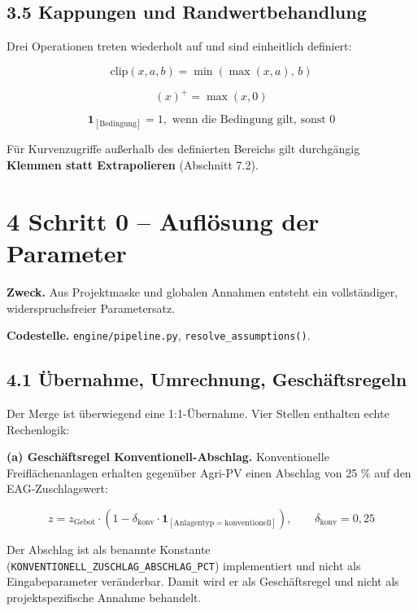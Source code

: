 \documentclass[
  a4paper,
  10pt]{article}
\begin{document}
\hypertarget{kappungen-und-randwertbehandlung}{%
\subsection{3.5 Kappungen und
Randwertbehandlung}\label{kappungen-und-randwertbehandlung}}

Drei Operationen treten wiederholt auf und sind einheitlich definiert:

\[ \mathrm{clip}(x, a, b) = \min\left(\max(x, a),\, b\right) \]

\[ (x)^{+} = \max(x, 0) \]

\[ \mathbf{1}_{[\text{Bedingung}]} = 1, \text{ wenn die Bedingung gilt, sonst } 0 \]

Für Kurvenzugriffe außerhalb des definierten Bereichs gilt durchgängig
\textbf{Klemmen statt Extrapolieren} (Abschnitt 7.2).

\hypertarget{schritt-0-aufluxf6sung-der-parameter}{%
\section{4 Schritt 0 -- Auflösung der
Parameter}\label{schritt-0-aufluxf6sung-der-parameter}}

\textbf{Zweck.} Aus Projektmaske und globalen Annahmen entsteht ein
vollständiger, widerspruchsfreier Parametersatz.

\textbf{Codestelle.} \nolinkurl{engine/pipeline.py},
\texttt{resolve\_assumptions()}.

\hypertarget{uxfcbernahme-umrechnung-geschuxe4ftsregeln}{%
\subsection{4.1 Übernahme, Umrechnung,
Geschäftsregeln}\label{uxfcbernahme-umrechnung-geschuxe4ftsregeln}}

Der Merge ist überwiegend eine 1:1-Übernahme. Vier Stellen enthalten
echte Rechenlogik:

\textbf{(a) Geschäftsregel Konventionell-Abschlag.} Konventionelle
Freiflächenanlagen erhalten gegenüber Agri-PV einen Abschlag von 25 \%
auf den EAG-Zuschlagswert:

\[ z = z_{\mathrm{Gebot}} \cdot \left(1 - \delta_{\mathrm{konv}} \cdot \mathbf{1}_{[\text{Anlagentyp} = \text{konventionell}]}\right), \qquad \delta_{\mathrm{konv}} = 0{,}25 \]

Der Abschlag ist als benannte Konstante
(\texttt{KONVENTIONELL\_ZUSCHLAG\_ABSCHLAG\_PCT}) implementiert und
nicht als Eingabeparameter veränderbar. Damit wird er als Geschäftsregel
und nicht als projektspezifische Annahme behandelt.
\end{document}
